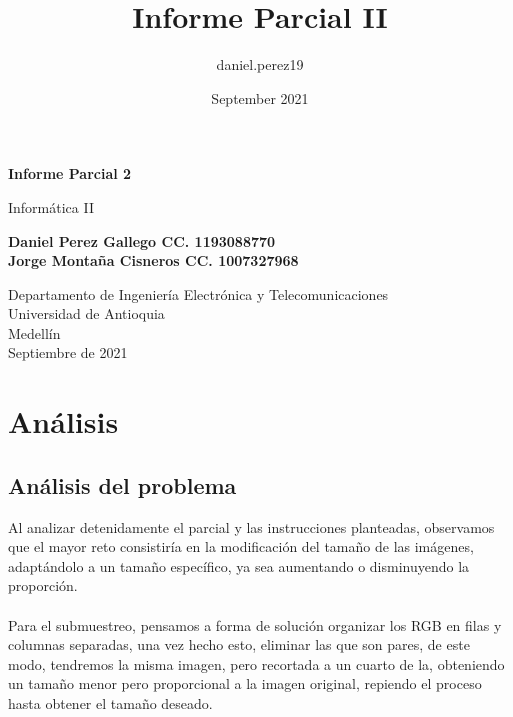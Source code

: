 \documentclass{article}
\title{Informe Parcial II}
\author{daniel.perez19 }
\date{September 2021}
\begin{document}
\begin{titlepage}
    \begin{center}
        \vspace*{1cm}
            
        \Huge
        \textbf{Informe Parcial 2}
            
        \vspace{0.5cm}
        \LARGE
        Informática II
            
        \vspace{1.5cm}
            
        \textbf{Daniel Perez Gallego CC. 1193088770\\Jorge Montaña Cisneros CC.  1007327968}
            
        \vfill
            
        \vspace{0.8cm}
            
        \Large
        Departamento de Ingeniería Electrónica y Telecomunicaciones\\
        Universidad de Antioquia\\
        Medellín\\
        Septiembre de 2021
            
    \end{center}
\end{titlepage}

\tableofcontents

\section{Análisis}
\subsection{Análisis del problema}
Al analizar detenidamente el parcial y las instrucciones planteadas, observamos que el mayor reto consistiría en la modificación del tamaño de las imágenes, adaptándolo a un tamaño específico, ya sea aumentando o disminuyendo la proporción.\\ 
\\Para el submuestreo, pensamos a forma de solución organizar los RGB en filas y columnas separadas, una vez hecho esto, eliminar las que son pares, de este modo, tendremos la misma imagen, pero recortada a un cuarto de la,  obteniendo un tamaño menor pero proporcional a la imagen original, repiendo el proceso hasta obtener el tamaño deseado.\\
\end{document}
